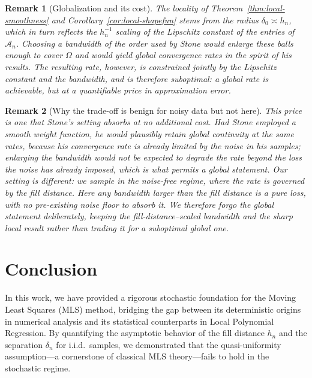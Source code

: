 \documentclass{article}
\newtheorem{remark}{Remark}
\begin{document}
\begin{remark}[Globalization and its cost]\label{rem:global-cost}
The locality of Theorem~\ref{thm:local-smoothness} and
Corollary~\ref{cor:local-shapefun} stems from the radius $\delta_0 \asymp h_n$,
which in turn reflects the $h_n^{-1}$ scaling of the Lipschitz constant of the
entries of $\mathscr{A}_n$. Choosing a bandwidth of the order used by Stone
\cite{stone1982optimal} would enlarge these balls enough to cover $\Omega$ and
would yield global convergence rates in the spirit of his results. The resulting
rate, however, is constrained jointly by the Lipschitz constant and the
bandwidth, and is therefore suboptimal: a global rate is achievable, but at a
quantifiable price in approximation error.
\end{remark}
 
\begin{remark}[Why the trade-off is benign for noisy data but not here]\label{rem:noise}
This price is one that Stone's setting absorbs at no additional cost. Had Stone
employed a smooth weight function, he would plausibly retain global continuity at
the same rates, because his convergence rate is already limited by the noise in
his samples; enlarging the bandwidth would not be expected to degrade the rate
beyond the loss the noise has already imposed, which is what permits a global
statement. Our setting is different: we sample in the noise-free regime, where the
rate is governed by the fill distance. Here any bandwidth larger than the fill
distance is a pure loss, with no pre-existing noise floor to absorb it. We
therefore forgo the global statement deliberately, keeping the
fill-distance--scaled bandwidth and the sharp local result rather than trading it
for a suboptimal global one.
\end{remark}
 
\section{Conclusion}

In this work, we have provided a rigorous stochastic foundation for the Moving
Least Squares (MLS) method, bridging the gap between its deterministic origins in
numerical analysis and its statistical counterparts in Local Polynomial
Regression. By quantifying the asymptotic behavior of the fill distance $h_n$ and
the separation $\delta_n$ for i.i.d.\ samples, we demonstrated that the
quasi-uniformity assumption---a cornerstone of classical MLS theory---fails to
hold in the stochastic regime.
\end{document}

